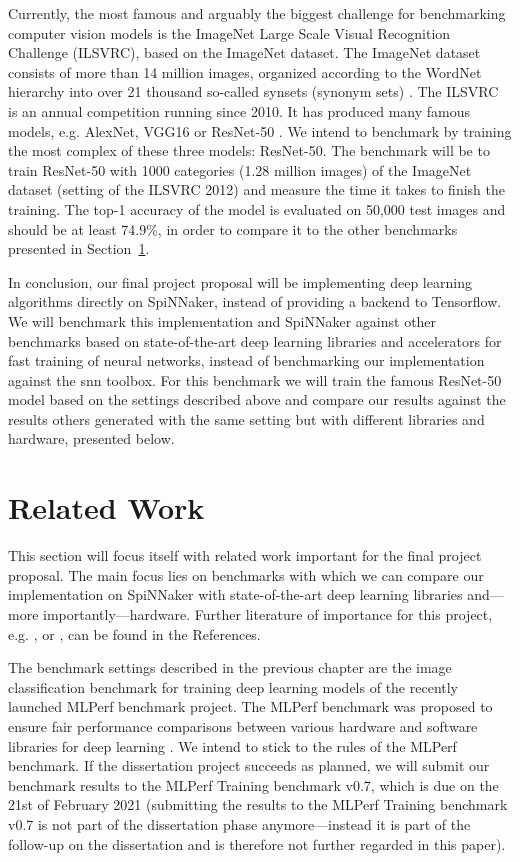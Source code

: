 \documentclass{article}
\begin{document}
Currently, the most famous and arguably the biggest challenge
for benchmarking computer vision models is the
ImageNet Large Scale Visual Recognition Challenge (ILSVRC),
based on the ImageNet dataset.
The ImageNet dataset consists of more than 14 million
images, organized according to the WordNet hierarchy into
over 21 thousand so-called synsets (synonym sets)
\citep{imagenet, wordnet}.
The ILSVRC is an annual competition running since 2010.
It has produced many famous models, e.g. AlexNet, VGG16 or
ResNet-50 \citep{alexnet, simonyan_et_al_2014,
  he_et_al_2015}.
We intend to benchmark by training the most complex of
these three models: ResNet-50.
The benchmark will be to train ResNet-50 with 1000
categories (1.28 million images) of the ImageNet dataset
(setting of the ILSVRC 2012) and measure the time it takes
to finish the training.
The top-1 accuracy of the model is evaluated on 50,000 test
images and should be at least 74.9\%, in order to compare
it to the other benchmarks presented in
Section~\ref{sec:related_work}.

In conclusion, our final project proposal will be
implementing deep learning algorithms directly on
SpiNNaker, instead of providing a backend to Tensorflow.
We will benchmark this implementation and SpiNNaker against
other benchmarks based on state-of-the-art deep learning
libraries and accelerators for fast training of neural
networks, instead of benchmarking our implementation
against the snn toolbox.
For this benchmark we will train the famous ResNet-50 model
based on the settings described above and compare our
results against the results others generated with the same
setting but with different libraries and hardware, presented below.


\section{Related Work} %
\label{sec:related_work}

This section will focus itself with related work important
for the final project proposal.
The main focus lies on benchmarks with which we can
compare our implementation on SpiNNaker with state-of-the-art
deep learning libraries and---more importantly---hardware.
Further literature of importance for this project, e.g.
\citet{he_et_al_2015}, \citet{goodfellow2016} or
\citet{imagenet}, can be found in the References.

The benchmark settings described in the previous chapter
are the image classification benchmark for training deep
learning models of the recently launched MLPerf benchmark
project.
The MLPerf benchmark was proposed to ensure fair
performance comparisons between various hardware and
software libraries for deep learning
\citep{mattson_et_al_2019}.
We intend to stick to the rules of the MLPerf benchmark.
If the dissertation project succeeds as planned, we
will submit our benchmark results to the MLPerf Training
benchmark v0.7, which is due on the 21st of February 2021
(submitting the results to the MLPerf Training benchmark
v0.7 is not part of the dissertation phase
anymore---instead it is part of the follow-up on the
dissertation and is therefore not further regarded in this
paper).
\end{document}
